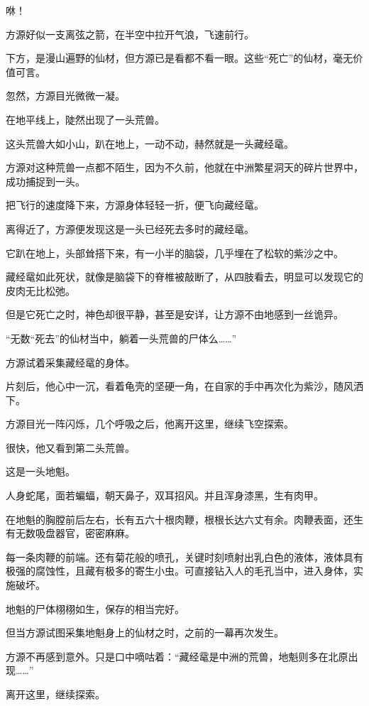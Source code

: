 
\begin{this_body}

咻！

方源好似一支离弦之箭，在半空中拉开气浪，飞速前行。

下方，是漫山遍野的仙材，但方源已是看都不看一眼。这些“死亡”的仙材，毫无价值可言。

忽然，方源目光微微一凝。

在地平线上，陡然出现了一头荒兽。

这头荒兽大如小山，趴在地上，一动不动，赫然就是一头藏经鼋。

方源对这种荒兽一点都不陌生，因为不久前，他就在中洲繁星洞天的碎片世界中，成功捕捉到一头。

把飞行的速度降下来，方源身体轻轻一折，便飞向藏经鼋。

离得近了，方源便发现这是一头已经死去多时的藏经鼋。

它趴在地上，头部耸搭下来，有一小半的脑袋，几乎埋在了松软的紫沙之中。

藏经鼋如此死状，就像是脑袋下的脊椎被敲断了，从四肢看去，明显可以发现它的皮肉无比松弛。

但是它死亡之时，神色却很平静，甚至是安详，让方源不由地感到一丝诡异。

“无数“死去”的仙材当中，躺着一头荒兽的尸体么……”

方源试着采集藏经鼋的身体。

片刻后，他心中一沉，看着龟壳的坚硬一角，在自家的手中再次化为紫沙，随风洒下。

方源目光一阵闪烁，几个呼吸之后，他离开这里，继续飞空探索。

很快，他又看到第二头荒兽。

这是一头地魁。

人身蛇尾，面若蝙蝠，朝天鼻子，双耳招风。并且浑身漆黑，生有肉甲。

在地魁的胸膛前后左右，长有五六十根肉鞭，根根长达六丈有余。肉鞭表面，还生有无数吸盘器官，密密麻麻。

每一条肉鞭的前端。还有菊花般的喷孔，关键时刻喷射出乳白色的液体，液体具有极强的腐蚀性，且藏有极多的寄生小虫。可直接钻入人的毛孔当中，进入身体，实施破坏。

地魁的尸体栩栩如生，保存的相当完好。

但当方源试图采集地魁身上的仙材之时，之前的一幕再次发生。

方源不再感到意外。只是口中嘀咕着：“藏经鼋是中洲的荒兽，地魁则多在北原出现……”

离开这里，继续探索。


\end{this_body}
